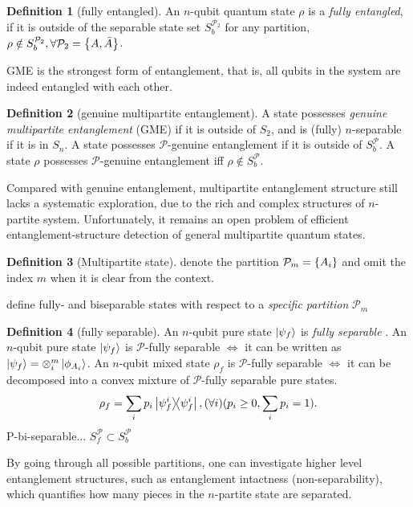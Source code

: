 \documentclass[
10pt,
aps,
pra,
linenumbers,
floatfix,
]{revtex4-2}
\theoremstyle{plain}
\theoremstyle{definition}
\newtheorem{definition}{Definition}
\newtheorem{remark}{Remark}
\newcommand{\separable}{S}
\newcommand{\ppartition}{\mathcal{P}}
\newcommand{\dm}{\rho}
\begin{document}
\begin{definition}[fully entangled]\label{def:fully_entangled}
	An $n$-qubit quantum state $\dm$ is a \emph{fully entangled},
	if it is outside of the separable state set $S_b^{\ppartition_2}$ for any partition,
	$\dm \notin S_b^{\ppartition_2},\forall \ppartition_2 = \qty{A,\bar{A}}$.
\end{definition}
GME is the strongest form of entanglement, that is, 
all qubits in the system are indeed entangled with each other.
\begin{definition}[genuine multipartite entanglement]\label{def:gme}
	A state possesses \emph{genuine multipartite entanglement} (GME) if it is outside of $S_2$, and is (fully) $n$-separable if it is in $S_n$.
	A state possesses $\ppartition$-genuine entanglement if it is outside of $S_b^\ppartition$.
	A state $\dm$ possesses $\ppartition$-genuine entanglement iff $\dm\notin S_b^\ppartition$.
\end{definition}
	Compared with genuine entanglement, multipartite entanglement structure still lacks a systematic exploration, due to the rich and complex structures of $n$-partite system.
	Unfortunately, it remains an open problem of efficient entanglement-structure detection of general multipartite quantum states.
\begin{definition}[Multipartite state]
	denote the partition $\ppartition_m = \qty{A_i}$
	and omit the index $m$ when it is clear from the context.
\end{definition}
define fully- and biseparable states with respect to a \emph{specific partition} $\ppartition_m$
\begin{definition}[fully separable]\label{def:fully_separable}
	An $n$-qubit pure state $\ket{\psi_f}$ is \emph{fully separable} \iff .
	An $n$-qubit pure state $\ket{\psi_f}$ is $\ppartition$-fully separable $\iff$ it can be written as 
	$\ket{\psi_f}=\otimes_i^m \ket{\phi_{A_i}}$.
	An $n$-qubit mixed state $\dm_f$ is $\ppartition$-fully separable $\iff$ it can be decomposed into a convex mixture of $\ppartition$-fully separable pure states.
	\begin{equation}
		\dm_f = \sum_i p_i \op{\psi_f^i}, (\forall i) ( p_i\ge 0, \sum_i p_i = 1) .
	\end{equation}
	P-bi-separable... $\separable_f^\ppartition \subset S_b^\ppartition$
\end{definition}
By going through all possible partitions, one can investigate higher level entanglement structures, such as entanglement intactness (non-separability), which quantifies how many pieces in the $n$-partite state are separated.
\end{document}
